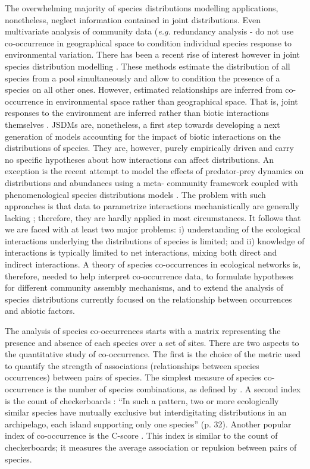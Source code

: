 The overwhelming majority of species distributions modelling applications, nonetheless, neglect information contained in joint distributions. Even multivariate analysis of community data (\textit{e.g.} redundancy analysis - \citep{legendre2012numerical} do not use co-occurrence in geographical space to condition individual species response to environmental variation.  There has been a recent rise of interest however in joint species distribution modelling \citep{Clark2014, Harris2015, Pollock2014}. These methods estimate the distribution of all species from a pool simultaneously and allow to condition the presence of a species on all other ones. However, estimated relationships are inferred from co-occurrence in environmental space rather than geographical space. That is, joint responses to the environment are inferred rather than biotic interactions themselves \citep{Baselga2009}. JSDMs are, nonetheless, a first step towards developing a next generation of models accounting for the impact of biotic interactions on the distributions of species. They are, however, purely empirically driven and carry no specific hypotheses about how interactions can affect distributions. An exception is the recent attempt to model the effects of predator-prey dynamics on distributions and abundances using a meta- community framework coupled with phenomenological species distributions models \citep{Fordham2013}. The problem with such approaches is that data to parametrize interactions mechanistically are generally lacking \citep{Morales-Castilla2015}; therefore, they are hardly applied in most circumstances. It follows that we are faced with at least two major problems: i) understanding of the ecological interactions underlying the distributions of species is limited; and ii) knowledge of interactions is typically limited to net interactions, mixing both direct and indirect interactions. A theory of species co-occurrences in ecological networks is, therefore, needed to help interpret co-occurrence data, to formulate hypotheses for different community assembly mechanisms, and to extend the analysis of species distributions currently focused on the relationship between occurrences and abiotic factors.

The analysis of species co-occurrences starts with a matrix representing the presence and absence of each species over a set of sites. There are two aspects to the quantitative study of co-occurrence. The first is the choice of the metric used to quantify the strength of associations (relationships between species occurrences) between pairs of species. The simplest measure of species co-occurrence is the number of species combinations, as defined by \cite{Pielou1968}. A second
index is the count of checkerboards \cite{Diamond1975}: ``In such a
pattern, two or more ecologically similar species have mutually exclusive but
interdigitating distributions in an archipelago, each island supporting only
one species'' (p. 32). Another popular index of co-occurrence is the C-score
\citep{Stone1990}. This index is similar to the count of
checkerboards; it measures the average association or repulsion between pairs
of species.

